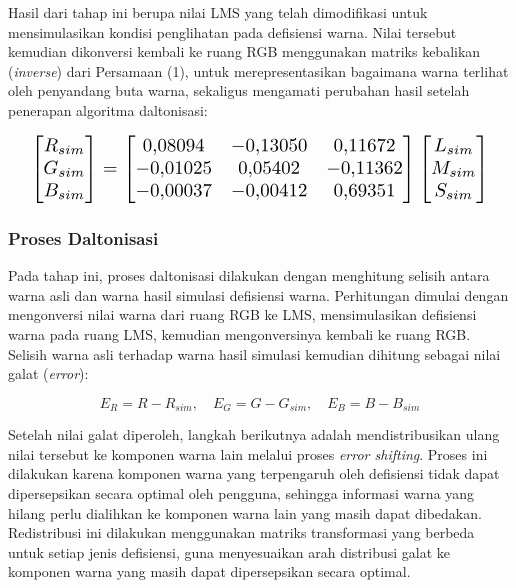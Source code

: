 Hasil dari tahap ini berupa nilai LMS yang telah dimodifikasi untuk mensimulasikan kondisi penglihatan pada defisiensi warna. Nilai tersebut kemudian dikonversi kembali ke ruang RGB menggunakan matriks kebalikan (\textit{inverse}) dari Persamaan (1), untuk merepresentasikan bagaimana warna terlihat oleh penyandang buta warna, sekaligus mengamati perubahan hasil setelah penerapan algoritma daltonisasi:

\begin{equation}
\resizebox{0.95\linewidth}{!}{$\displaystyle
\begin{bmatrix} R_{sim} \\ G_{sim} \\ B_{sim} \end{bmatrix} =
\begin{bmatrix} 0{,}08094 & -0{,}13050 & 0{,}11672 \\ -0{,}01025 & 0{,}05402 & -0{,}11362 \\ -0{,}00037 & -0{,}00412 & 0{,}69351 \end{bmatrix}
\begin{bmatrix} L_{sim} \\ M_{sim} \\ S_{sim} \end{bmatrix}$}
\end{equation}

\subsubsection{Proses Daltonisasi}

Pada tahap ini, proses daltonisasi dilakukan dengan menghitung selisih antara warna asli dan warna hasil simulasi defisiensi warna. Perhitungan dimulai dengan mengonversi nilai warna dari ruang RGB ke LMS, mensimulasikan defisiensi warna pada ruang LMS, kemudian mengonversinya kembali ke ruang RGB. Selisih warna asli terhadap warna hasil simulasi kemudian dihitung sebagai nilai galat (\textit{error}):

\begin{equation}
E_R = R - R_{sim}, \quad E_G = G - G_{sim}, \quad E_B = B - B_{sim}
\end{equation}

Setelah nilai galat diperoleh, langkah berikutnya adalah mendistribusikan ulang nilai tersebut ke komponen warna lain melalui proses \textit{error shifting}. Proses ini dilakukan karena komponen warna yang terpengaruh oleh defisiensi tidak dapat dipersepsikan secara optimal oleh pengguna, sehingga informasi warna yang hilang perlu dialihkan ke komponen warna lain yang masih dapat dibedakan. Redistribusi ini dilakukan menggunakan matriks transformasi yang berbeda untuk setiap jenis defisiensi, guna menyesuaikan arah distribusi galat ke komponen warna yang masih dapat dipersepsikan secara optimal.

